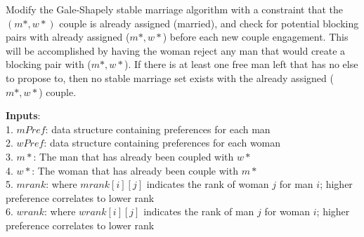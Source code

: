 \documentclass[twoside]{article}
\begin{document}
Modify the Gale-Shapely stable marriage algorithm with a constraint that the $(m*,w*)$ couple is already assigned (married), and check for potential blocking pairs with already assigned ($m*, w*$) before each new couple engagement.
 This will be accomplished by having the woman reject any man that would create a blocking pair with ($m*, w*$).  If there is at least one free man left that has no else to propose to, then no stable marriage set exists with the already assigned ($m*, w*$) couple. 

\textbf{Inputs}:\\
1. $mPref$: data structure containing preferences for each man \\
2. $wPref$: data structure containing preferences for each woman \\
3. $m*$: The man that has already been coupled with $w*$ \\
4. $w*$: The woman that has already been couple with $m*$ \\
5. $mrank$: where $mrank[i][j]$ indicates the rank of woman $j$ for man $i$; higher preference correlates to lower rank \\
6. $wrank$: where $wrank[i][j]$ indicates the rank of man $j$ for woman $i$; higher preference correlates to lower rank \\
\end{document}
